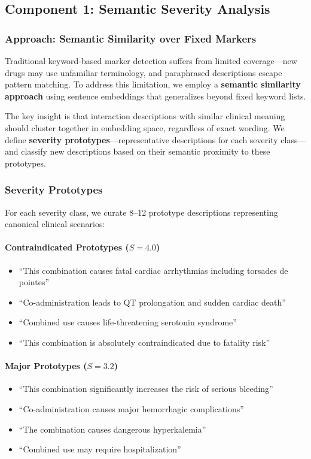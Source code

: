 \documentclass[11pt,a4paper]{article}
\begin{document}
\subsection{Component 1: Semantic Severity Analysis}

\subsubsection{Approach: Semantic Similarity over Fixed Markers}

Traditional keyword-based marker detection suffers from limited coverage---new drugs may use unfamiliar terminology, and paraphrased descriptions escape pattern matching. To address this limitation, we employ a \textbf{semantic similarity approach} using sentence embeddings that generalizes beyond fixed keyword lists.

The key insight is that interaction descriptions with similar clinical meaning should cluster together in embedding space, regardless of exact wording. We define \textbf{severity prototypes}---representative descriptions for each severity class---and classify new descriptions based on their semantic proximity to these prototypes.

\subsubsection{Severity Prototypes}

For each severity class, we curate 8--12 prototype descriptions representing canonical clinical scenarios:

\paragraph{Contraindicated Prototypes ($S = 4.0$)}
\begin{itemize}
    \item ``This combination causes fatal cardiac arrhythmias including torsades de pointes''
    \item ``Co-administration leads to QT prolongation and sudden cardiac death''
    \item ``Combined use causes life-threatening serotonin syndrome''
    \item ``This combination is absolutely contraindicated due to fatality risk''
\end{itemize}

\paragraph{Major Prototypes ($S = 3.2$)}
\begin{itemize}
    \item ``This combination significantly increases the risk of serious bleeding''
    \item ``Co-administration causes major hemorrhagic complications''
    \item ``The combination causes dangerous hyperkalemia''
    \item ``Combined use may require hospitalization''
\end{itemize}
\end{document}
